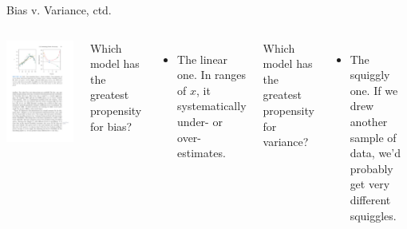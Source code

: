\documentclass[aspectratio=169]{beamer}
\begin{document}
\begin{frame}{Bias v. Variance, ctd.}


\begin{columns}

\includegraphics[scale=1]{figures/islr2_9a.pdf}


Which model has the greatest propensity for bias?
\begin{itemize}
\item<2-> The linear one.  In ranges of $x$, it systematically under- or over-estimates. 
\end{itemize}

\hspace{5mm}

Which model has the greatest propensity for variance?
\begin{itemize}
\item<3-> The squiggly one.  If we drew another sample of data, we'd probably get very different squiggles.
\end{itemize}
\end{columns}



\end{frame}
\end{document}
